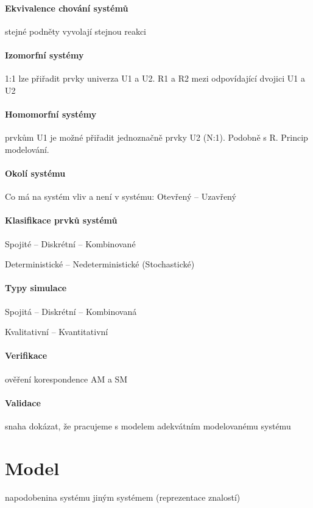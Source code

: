 \documentclass[a4wide]{report}
\begin{document}
\paragraph{Ekvivalence chování systémů} stejné podněty vyvolají stejnou reakci

\paragraph{Izomorfní systémy} 1:1 lze přiřadit prvky univerza U1 a U2. R1 a R2 mezi odpovídající dvojici U1 a U2

\paragraph{Homomorfní systémy} prvkům U1 je možné přiřadit jednoznačně prvky U2 (N:1). Podobně s R. Princip modelování.

\paragraph{Okolí systému} Co má na systém vliv a není v systému: Otevřený -- Uzavřený

\paragraph{Klasifikace prvků systémů} Spojité -- Diskrétní -- Kombinované

Deterministické -- Nedeterministické (Stochastické)

\paragraph{Typy simulace} Spojitá -- Diskrétní -- Kombinovaná

Kvalitativní -- Kvantitativní

\paragraph{Verifikace} ověření korespondence AM a SM

\paragraph{Validace} snaha dokázat, že pracujeme s modelem adekvátním modelovanému systému



\section{Model}
napodobenina systému jiným systémem (reprezentace znalostí)
\end{document}
